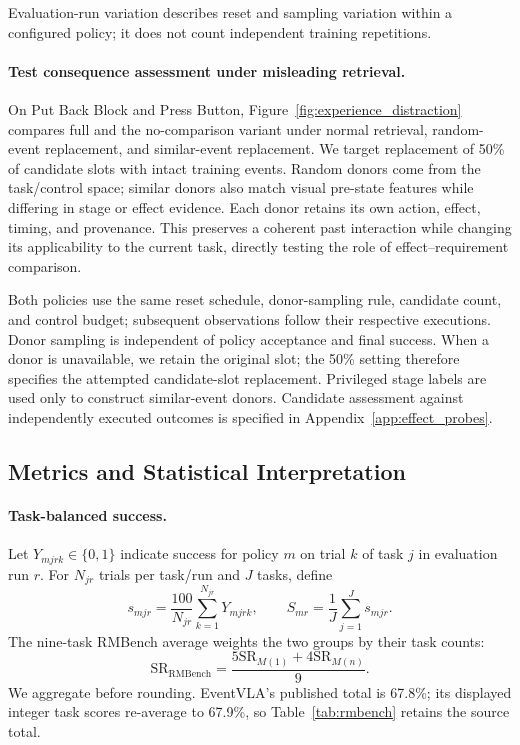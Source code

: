 Evaluation-run variation describes reset and sampling variation within a configured policy; it does not count independent training repetitions.

\paragraph{Test consequence assessment under misleading retrieval.}
\label{app:distraction_protocol}
On Put Back Block and Press Button, Figure~\ref{fig:experience_distraction} compares full \method{} and the no-comparison variant under normal retrieval, random-event replacement, and similar-event replacement.
We target replacement of 50\% of candidate slots with intact training events.
Random donors come from the task/control space; similar donors also match visual pre-state features while differing in stage or effect evidence.
Each donor retains its own action, effect, timing, and provenance.
This preserves a coherent past interaction while changing its applicability to the current task, directly testing the role of effect--requirement comparison.

Both policies use the same reset schedule, donor-sampling rule, candidate count, and control budget; subsequent observations follow their respective executions.
Donor sampling is independent of policy acceptance and final success.
When a donor is unavailable, we retain the original slot; the 50\% setting therefore specifies the attempted candidate-slot replacement.
Privileged stage labels are used only to construct similar-event donors.
Candidate assessment against independently executed outcomes is specified in Appendix~\ref{app:effect_probes}.

\subsection{Metrics and Statistical Interpretation}
\label{app:evidence}

\paragraph{Task-balanced success.}
Let $Y_{mjrk}\in\{0,1\}$ indicate success for policy $m$ on trial $k$ of task $j$ in evaluation run $r$.
For $N_{jr}$ trials per task/run and $J$ tasks, define
\begin{equation}
 s_{mjr}=\frac{100}{N_{jr}}\sum_{k=1}^{N_{jr}}Y_{mjrk},\qquad
 S_{mr}=\frac1J\sum_{j=1}^J s_{mjr}.
 \label{eq:exp_macro_sr}
\end{equation}
The nine-task RMBench average weights the two groups by their task counts:
\begin{equation}
 \mathrm{SR}_{\mathrm{RMBench}}
 =\frac{5\mathrm{SR}_{M(1)}+4\mathrm{SR}_{M(n)}}9.
 \label{eq:exp_rmbench_weighting}
\end{equation}
We aggregate before rounding.
EventVLA's published total is 67.8\%; its displayed integer task scores re-average to 67.9\%, so Table~\ref{tab:rmbench} retains the source total.

